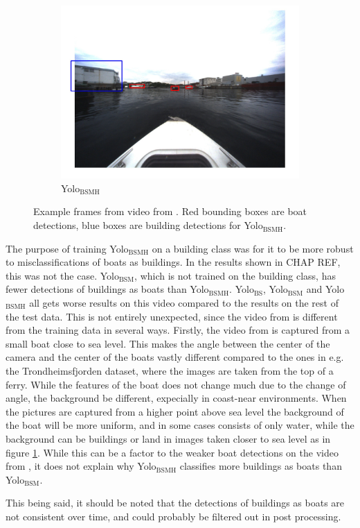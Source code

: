 \begin{figure}[h!]
\begin{subfigure}[b]{0.6\textwidth}
   \includegraphics[width=1\linewidth]{results/kamsvag/yolo3_figure_1479.jpg}
   \caption{Yolo$_{\text{BSMH}}$}
\end{subfigure}
\caption{Example frames from video from \citep{Kamsvag2018}. Red bounding boxes are boat detections, blue boxes are building detections for Yolo$_{\text{BSMH}}$.}
\label{fig:kamsvaag_vid}
\end{figure}


The purpose of training Yolo$_{\text{BSMH}}$ on a building class was for it to be more robust to misclassifications of boats as buildings. In the results shown in CHAP REF, this was not the case. Yolo$_{\text{BSM}}$, which is not trained on the building class, has fewer detections of buildings as boats than Yolo$_{\text{BSMH}}$. Yolo$_{\text{BS}}$, Yolo$_{\text{BSM}}$ and Yolo$_{\text{BSMH}}$ all gets worse results on this video compared to the results on the rest of the test data. This is not entirely unexpected, since the video from \citep{Kamsvag2018} is different from the training data in several ways. Firstly, the video from \citep{Kamsvag2018} is captured from a small boat close to sea level. This makes the angle between the center of the camera and the center of the boats vastly different compared to the ones in e.g. the Trondheimsfjorden dataset, where the images are taken from the top of a ferry. While the features of the boat does not change much due to the change of angle, the background be different, expecially in coast-near environments. When the pictures are captured from a higher point above sea level the background of the boat will be more uniform, and in some cases consists of only water, while the background can be buildings or land in images taken closer to sea level as in figure \ref{fig:kamsvaag_vid}. While this can be a factor to the weaker boat detections on the video from \citep{Kamsvag2018}, it does not explain why Yolo$_{\text{BSMH}}$ classifies more buildings as boats than Yolo$_{\text{BSM}}$.

\vspace{3mm}

This being said, it should be noted that the detections of buildings as boats are not consistent over time, and could probably be filtered out in post processing.